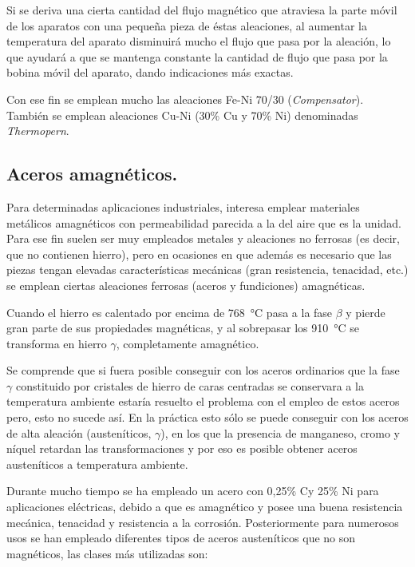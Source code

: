 \documentclass[12pt,a4paper]{article}
\begin{document}
Si se deriva una cierta cantidad del flujo magnético que atraviesa la parte móvil de los aparatos con una pequeña pieza de éstas aleaciones, al aumentar la temperatura del aparato disminuirá mucho el flujo que pasa por la aleación, lo que ayudará a que se mantenga constante la cantidad de flujo que pasa por la bobina móvil del aparato, dando indicaciones más exactas.

Con ese fin se emplean mucho las aleaciones Fe-Ni 70/30 (\textit{Compensator}). También se emplean aleaciones Cu-Ni (30\% Cu y 70\% Ni) denominadas \textit{Thermopern}.

\subsection{Aceros amagnéticos.}

Para determinadas aplicaciones industriales, interesa emplear materiales metálicos amagnéticos con permeabilidad parecida a la del aire que es la unidad. Para ese fin suelen ser muy empleados metales y aleaciones no ferrosas (es decir, que no contienen hierro), pero en ocasiones en que además es necesario que las piezas tengan elevadas características mecánicas (gran resistencia, tenacidad, etc.) se emplean ciertas aleaciones ferrosas (aceros y fundiciones) amagnéticas.

Cuando el hierro es calentado por encima de \SI{768}{\celsius} pasa a la fase $\beta$ y pierde gran parte de sus propiedades magnéticas, y al sobrepasar los \SI{910}{\celsius} se transforma en hierro $\gamma$, completamente amagnético.

Se comprende que si fuera posible conseguir con los aceros ordinarios que la fase $\gamma$ constituido por cristales de hierro de caras centradas se conservara a la temperatura ambiente estaría resuelto el problema con el empleo de estos aceros pero, esto no sucede así. En la práctica esto sólo se puede conseguir con los aceros de alta aleación (austeníticos, $\gamma$), en los que la presencia de manganeso, cromo y níquel retardan las transformaciones y por eso es posible obtener aceros austeníticos a temperatura ambiente.

Durante mucho tiempo se ha empleado un acero con 0,25\% Cy 25\% Ni para aplicaciones eléctricas, debido a que es amagnético y posee una buena resistencia mecánica, tenacidad y resistencia a la corrosión. Posteriormente para numerosos usos se han empleado diferentes tipos de aceros austeníticos que no son magnéticos, las clases más utilizadas son: 
\end{document}
